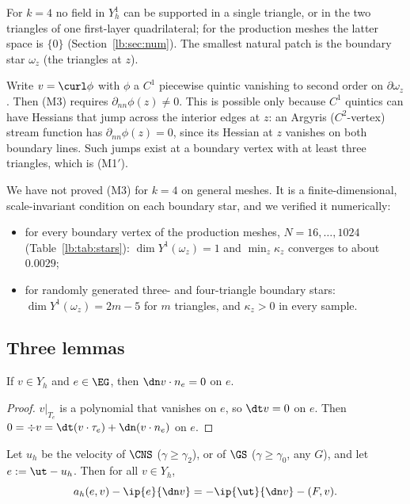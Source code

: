 \begin{remark}[$k=4$]\label{lb:k4}
For $k=4$ no field in $Y_h^1$ can be supported in a single triangle, or in the two triangles of one first-layer quadrilateral; for the production meshes the latter space is $\{0\}$ (Section~\ref{lb:sec:num}). The smallest natural patch is the boundary star $\omega_z$ (the triangles at $z$).

Write $v=\curl\phi$ with $\phi$ a $C^1$ piecewise quintic vanishing to second order on $\partial\omega_z$. Then (M3) requires $\partial_{nn}\phi(z)\neq0$. This is possible only because $C^1$ quintics can have Hessians that jump across the interior edges at $z$: an Argyris ($C^2$-vertex) stream function has $\partial_{nn}\phi(z)=0$, since its Hessian at $z$ vanishes on both boundary lines. Such jumps exist at a boundary vertex with at least three triangles, which is (M1$'$).

We have not proved (M3) for $k=4$ on general meshes. It is a finite-dimensional, scale-invariant condition on each boundary star, and we verified it numerically:
\begin{itemize}
\item for every boundary vertex of the production meshes, $N=16,\dots,1024$ (Table~\ref{lb:tab:stars}): $\dim Y^1(\omega_z)=1$ and $\min_z\kappa_z$ converges to about $0.0029$;
\item for randomly generated three- and four-triangle boundary stars: $\dim Y^1(\omega_z)=2m-5$ for $m$ triangles, and $\kappa_z>0$ in every sample.
\end{itemize}
\end{remark}

\subsection{Three lemmas}

\begin{lemma}\label{lb:normal}
If $v\in Y_h$ and $e\in\EG$, then $\dn v\cdot n_e=0$ on $e$.
\end{lemma}

\begin{proof}
$v|_{T_e}$ is a polynomial that vanishes on $e$, so $\dt v=0$ on $e$. Then $0=\div v=\dt(v\cdot\tau_e)+\dn(v\cdot n_e)$ on $e$.
\end{proof}

\begin{lemma}\label{lb:identity}
Let $u_h$ be the velocity of $\CNS$ ($\gamma\ge\gamma_2$), or of $\GS$ ($\gamma\ge\gamma_0$, any $G$), and let $e:=\ut-u_h$. Then for all $v\in Y_h$,
\[
a_h(e,v)-\ip{e}{\dn v}=-\ip{\ut}{\dn v}-(F,v).
\]
\end{lemma}

